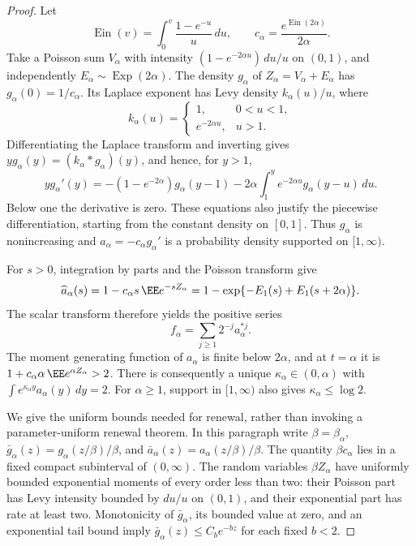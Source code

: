 \documentclass[11pt,letterpaper]{article}
\begin{document}
\begin{proof}
Let
\[
 \operatorname{Ein}(v)=\int_0^v\frac{1-e^{-u}}u\,du,\qquad
 c_\alpha=\frac{e^{\operatorname{Ein}(2\alpha)}}{2\alpha}.
\]
Take a Poisson sum $V_\alpha$ with intensity
$(1-e^{-2\alpha u})\,du/u$ on $(0,1)$, and independently
$E_\alpha\sim\operatorname{Exp}(2\alpha)$.
The density $g_\alpha$ of $Z_\alpha=V_\alpha+E_\alpha$ has
$g_\alpha(0)=1/c_\alpha$. Its Laplace exponent has Levy density
$k_\alpha(u)/u$, where
\[
 k_\alpha(u)=
 \begin{cases}1,&0<u<1,\\ e^{-2\alpha u},&u>1.\end{cases}
\]
Differentiating the Laplace transform and inverting gives
$y g_\alpha(y)=(k_\alpha*g_\alpha)(y)$, and hence, for $y>1$,
\begin{equation}\label{eq:finite-Dickman-derivative}
 y g_\alpha'(y)=
 -(1-e^{-2\alpha})g_\alpha(y-1)
 -2\alpha\int_1^y e^{-2\alpha u}g_\alpha(y-u)\,du.
\end{equation}
Below one the derivative is zero. These equations also justify the
piecewise differentiation, starting from the constant density on
$[0,1]$. Thus $g_\alpha$ is nonincreasing and
$a_\alpha=-c_\alpha g_\alpha'$ is a probability density supported on
$[1,\infty)$.

For $s>0$, integration by parts and the Poisson transform give
\[
 \widehat a_\alpha(s)
 =1-c_\alpha s\,\EE e^{-sZ_\alpha}
 =1-\exp\{-E_1(s)+E_1(s+2\alpha)\}.
\]
The scalar transform therefore yields the positive series
\begin{equation}\label{eq:finite-positive-geometric}
 f_\alpha=\sum_{j\ge1}2^{-j}a_\alpha^{*j}.
\end{equation}
The moment generating function of $a_\alpha$ is finite below
$2\alpha$, and at $t=\alpha$ it is
$1+c_\alpha\alpha\,\EE e^{\alpha Z_\alpha}>2$.
There is consequently a unique $\kappa_\alpha\in(0,\alpha)$ with
$\int e^{\kappa_\alpha y}a_\alpha(y)\,dy=2$.
For $\alpha\ge1$, support in $[1,\infty)$ also gives
$\kappa_\alpha\le\log2$.

We give the uniform bounds needed for renewal, rather than invoking
a parameter-uniform renewal theorem. In this paragraph write
$\beta=\beta_\alpha$,
$\bar g_\alpha(z)=g_\alpha(z/\beta)/\beta$, and
$\bar a_\alpha(z)=a_\alpha(z/\beta)/\beta$.
The quantity $\beta c_\alpha$ lies in a fixed compact subinterval of
$(0,\infty)$. The random variables $\beta Z_\alpha$ have uniformly
bounded exponential moments of every order less than two: their
Poisson part has Levy intensity bounded by $du/u$ on $(0,1)$,
and their exponential part has rate at least two.
Monotonicity of $\bar g_\alpha$, its bounded value at zero, and an
exponential tail bound imply
$\bar g_\alpha(z)\le C_b e^{-bz}$ for each fixed $b<2$.


\end{proof}
\end{document}
